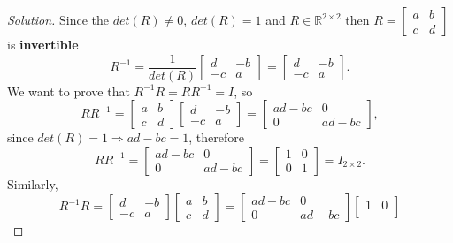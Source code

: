 \documentclass[12pt]{article}
\newenvironment{solution}{\begin{proof}[Solution]}{\end{proof}}
\begin{document}
\begin{solution}
Since the $det(R)\neq 0$, $det(R)=1$  and $R\in \mathbb{R}^{2 \times 2}$ then $R=\begin{bmatrix} 
a & b \\
c & d
\end{bmatrix}$ is \textbf{invertible}
\begin{equation*}
R^{-1}=\frac{1}{det(R)}\begin{bmatrix}
d & -b \\
-c & a
\end{bmatrix}= \begin{bmatrix}
d & -b \\
-c & a
\end{bmatrix} .
\end{equation*}
We want to prove that $R^{-1}R=RR^{-1}=I$, so
\begin{equation*}
RR^{-1}=\begin{bmatrix}
a & b \\
c & d
\end{bmatrix}\begin{bmatrix}
d & -b \\
-c & a
\end{bmatrix}=
\begin{bmatrix}
ad-bc & 0 \\
0 & ad-bc
\end{bmatrix}, 
\end{equation*}
since $det(R)=1 \Rightarrow ad-bc=1$, therefore
\begin{equation*}
RR^{-1}=
\begin{bmatrix}
ad-bc & 0 \\
0 & ad-bc
\end{bmatrix} =\begin{bmatrix}
1 & 0 \\
0 & 1
\end{bmatrix} =I_{2\times 2}.
\end{equation*}
Similarly, 
\begin{equation*}
R^{-1}R=\begin{bmatrix}
d & -b \\
-c & a
\end{bmatrix}\begin{bmatrix}
a & b \\
c & d
\end{bmatrix}=
\begin{bmatrix}
ad-bc & 0 \\
0 & ad-bc
\end{bmatrix}\begin{bmatrix}
1 & 0 \\

\end{bmatrix}
\end{equation*}
\end{solution}
\end{document}

